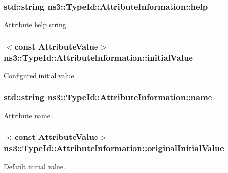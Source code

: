 \subsubsection[{\texorpdfstring{help}{help}}]{\setlength{\rightskip}{0pt plus 5cm}std\+::string ns3\+::\+Type\+Id\+::\+Attribute\+Information\+::help}\hypertarget{structns3_1_1TypeId_1_1AttributeInformation_ae65f436160b91c8c2d08b04663b24a3e}{}\label{structns3_1_1TypeId_1_1AttributeInformation_ae65f436160b91c8c2d08b04663b24a3e}
Attribute help string. 
\subsubsection[{\texorpdfstring{initial\+Value}{initialValue}}]{$<$const {\bf Attribute\+Value}$>$ ns3\+::\+Type\+Id\+::\+Attribute\+Information\+::initial\+Value}\hypertarget{structns3_1_1TypeId_1_1AttributeInformation_acd0766dbece64deff76f92fab61396e4}{}\label{structns3_1_1TypeId_1_1AttributeInformation_acd0766dbece64deff76f92fab61396e4}
Configured initial value. 
\subsubsection[{\texorpdfstring{name}{name}}]{\setlength{\rightskip}{0pt plus 5cm}std\+::string ns3\+::\+Type\+Id\+::\+Attribute\+Information\+::name}\hypertarget{structns3_1_1TypeId_1_1AttributeInformation_a24a42e783f06cd5b89ae8bbe729e482b}{}\label{structns3_1_1TypeId_1_1AttributeInformation_a24a42e783f06cd5b89ae8bbe729e482b}
Attribute name. 
\subsubsection[{\texorpdfstring{original\+Initial\+Value}{originalInitialValue}}]{$<$const {\bf Attribute\+Value}$>$ ns3\+::\+Type\+Id\+::\+Attribute\+Information\+::original\+Initial\+Value}\hypertarget{structns3_1_1TypeId_1_1AttributeInformation_a15ed13f2a95e9205ebb362e5bcb71db6}{}\label{structns3_1_1TypeId_1_1AttributeInformation_a15ed13f2a95e9205ebb362e5bcb71db6}
Default initial value. 
